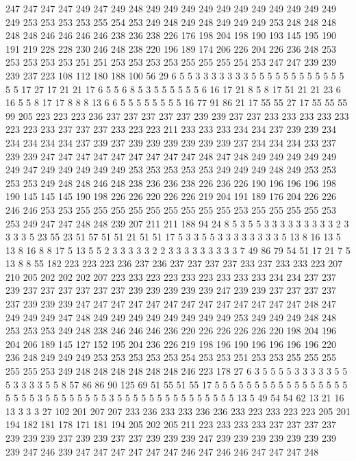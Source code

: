 247 247 247 247 249 247 249 248 249 249 249 249 249 249 249 249 249 249 249 249
253 253 253 253 255 254 253 249 248 249 248 249 249 249 253 248 248 248 248 248
246 246 246 246 238 236 238 226 176 198 204 198 190 193 145 195 190 191 219 228
228 230 246 248 238 220 196 189 174 206 226 204 226 236 248 253 253 253 253 253
251 251 253 253 253 253 255 255 255 254 253 247 247 239 239 239 237 223 108 112
180 188 100 56 29 6 5 5 3 3 3 3 3 3 3 5 5 5 5 5
5 5 5 5 5 5 5 5 5 17 27 17 21 21 17 6 5 5 6 8
5 3 5 5 5 5 5 5 6 16 17 21 8 5 8 17 51 21 21 23
6 16 5 5 8 17 17 8 8 8 13 6 6 5 5 5 5 5 5 5
5 16 77 91 86 21 17 55 55 27 17 55 55 55 99 205 223 223 223 236
237 237 237 237 237 239 239 237 237 233 233 233 233 233 223 223 233 237 237 237
233 223 223 211 233 233 233 234 234 237 239 239 234 234 234 234 234 237 239 237
239 239 239 239 239 239 237 234 234 234 233 237 239 239 247 247 247 247 247 247
247 247 247 248 247 248 249 249 249 249 249 249 247 249 249 249 249 249 253 253
253 253 253 249 249 249 248 249 253 253 253 253 249 248 248 246 248 238 236 236
238 226 236 226 190 196 196 196 198 190 145 145 145 190 198 226 226 220 226 226
219 204 191 189 176 204 226 226 246 246 253 253 255 255 255 255 255 255 255 255
255 253 255 255 255 255 253 253 249 247 247 248 248 239 207 211 211 188 94 24
8 5 3 5 5 3 3 3 3 3 3 3 3 3 2 3 3 3 3 5
23 55 23 51 57 51 51 21 51 51 17 5 3 3 5 5 3 3 3 3
3 3 3 3 5 13 8 16 13 5 13 8 16 8 8 17 5 13 5 5
2 3 3 3 3 3 2 2 3 3 3 3 3 3 3 3 3 7 49 86
79 54 51 17 21 7 5 13 8 8 55 182 223 223 223 236 237 236 237 237
237 237 233 237 233 233 223 207 210 205 202 202 202 207 223 233 223 223 233 223
233 233 233 234 234 237 237 239 237 237 237 237 237 237 239 239 239 239 239 247
239 239 237 237 237 237 237 239 239 239 247 247 247 247 247 247 247 247 247 247
247 247 247 248 247 249 249 249 247 248 249 249 249 249 249 249 249 249 253 249
249 249 248 248 253 253 253 249 248 238 246 246 246 236 220 226 226 226 226 220
198 204 196 204 206 189 145 127 152 195 204 236 226 219 198 196 190 196 196 196
196 220 236 248 249 249 249 253 253 253 253 253 254 253 253 251 253 253 255 255
255 255 255 253 249 248 248 248 248 248 248 246 223 178 27 6 3 5 5 5
5 3 3 3 3 3 5 5 5 3 3 3 3 5 5 8 57 86 86 90
125 69 51 55 51 55 17 5 5 5 5 5 5 5 5 5 5 5 5 5
5 5 5 5 5 5 5 5 3 5 5 5 5 5 5 5 5 3 5 5
5 5 5 5 5 5 5 5 5 5 5 5 5 13 5 49 54 54 62 13
21 16 13 3 3 3 27 102 201 207 207 233 236 233 233 236 236 233 223 233
223 223 205 201 194 182 181 178 171 181 194 205 202 205 211 223 233 233 233 237
237 237 237 239 239 239 237 239 239 237 237 239 239 239 247 239 239 239 239 239
239 239 239 247 246 239 247 247 247 247 247 247 246 247 246 246 247 247 247 248
